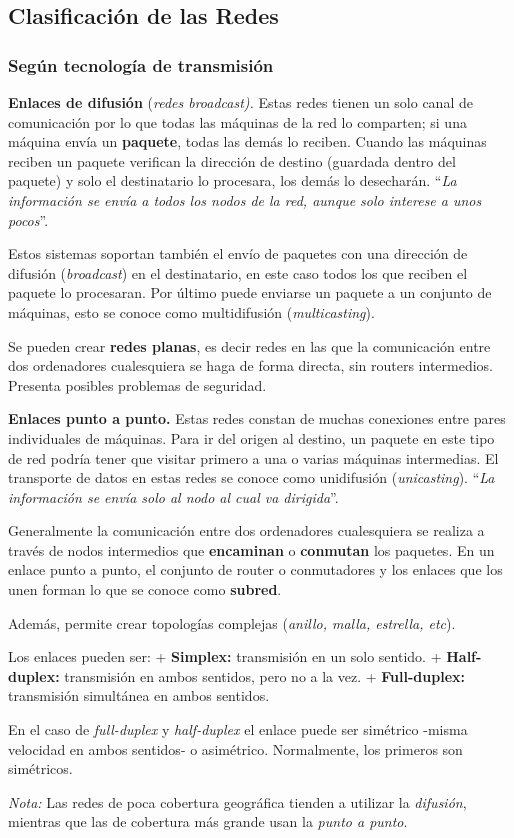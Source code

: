 \documentclass[10pt,a4paper]{article}
\begin{document}
\subsection{Clasificación de las Redes}
\subsubsection{Según tecnología de transmisión}
\begin{description}
\item \textbf{Enlaces de difusión} (\textit{redes broadcast).} Estas redes tienen un solo canal de comunicación por lo que todas las máquinas de la red lo comparten; si una máquina envía un \textbf{paquete}, todas las demás lo reciben. Cuando las máquinas reciben un paquete verifican la dirección de destino (guardada dentro del paquete) y solo el destinatario lo procesara, los demás lo desecharán. ``\textit{La información se envía a todos los nodos de la red, aunque solo interese a unos pocos}''.

Estos sistemas soportan también el envío de paquetes con una dirección de difusión (\textit{broadcast}) en el destinatario, en este caso todos los que reciben el paquete lo procesaran. Por último puede enviarse un paquete a un conjunto de máquinas, esto se conoce como multidifusión (\textit{multicasting}).

Se pueden crear \textbf{redes planas}, es decir redes en las que la comunicación entre dos ordenadores cualesquiera se haga de forma directa, sin routers intermedios. Presenta posibles problemas de seguridad.

\item \textbf{Enlaces punto a punto.} Estas redes constan de muchas conexiones entre pares individuales de máquinas. Para ir del origen al destino, un paquete en este tipo de red podría tener que visitar primero a una o varias máquinas intermedias. El transporte de datos en estas redes se conoce como unidifusión (\textit{unicasting}). ``\textit{La información se envía solo al nodo al cual va dirigida}''.

Generalmente la comunicación entre dos ordenadores cualesquiera se realiza a través de nodos intermedios que \textbf{encaminan} o \textbf{conmutan} los paquetes. En un enlace punto a punto, el conjunto de router o conmutadores y los enlaces que los unen forman lo que se conoce como \textbf{subred}.

Además, permite crear topologías complejas (\textit{anillo, malla, estrella, etc}).

Los enlaces pueden ser:
\subitem + \textbf{Simplex:} transmisión en un solo sentido.
\subitem + \textbf{Half-duplex:} transmisión en ambos sentidos, pero no a la vez.
\subitem + \textbf{Full-duplex:} transmisión simultánea en ambos sentidos.

En el caso de \textit{full-duplex} y \textit{half-duplex} el enlace puede ser simétrico -misma velocidad en ambos sentidos- o asimétrico. Normalmente, los primeros son simétricos.
\end{description}
\textit{Nota:} Las redes de poca cobertura geográfica tienden a utilizar la \textit{difusión}, mientras que las de cobertura más grande usan la \textit{punto a punto}.
\end{document}
